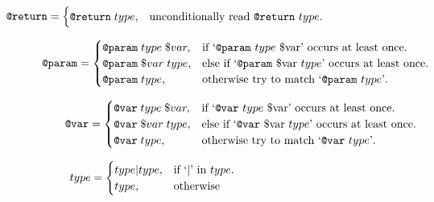 \documentclass[../main.tex]{subfiles}
\begin{document}
\begin{equation}
  \begin{aligned}
  \texttt{@return}=\begin{cases}
    \texttt{@return} \; type, & \text{unconditionally read \texttt{@return} $type$}.\\
  \end{cases}
  \end{aligned}
  \phantom{\hspace{8cm}} %
\end{equation}

\begin{equation}
  \begin{aligned}
  \texttt{@param}=\begin{cases}
    \texttt{@param} \; type \; \$var, & \text{if `\texttt{@param} $type$ \$var' occurs at least once}.\\
    \texttt{@param} \; \$var \; type, & \text{else if `\texttt{@param} \$var $type$' occurs at least once}.\\
    \texttt{@param} \; type, & \text{otherwise try to match `\texttt{@param} $type$'}.\\
  \end{cases}
  \end{aligned}
  \phantom{\hspace{3.55cm}} %
\end{equation}

\begin{equation}
  \begin{aligned}
  \texttt{@var}=\begin{cases}
    \texttt{@var} \; type \; \$var, & \text{if `\texttt{@var} $type$ \$var' occurs at least once}.\\
    \texttt{@var} \; \$var \; type, & \text{else if `\texttt{@var} \$var $type$' occurs at least once}.\\
    \texttt{@var} \; type, & \text{otherwise try to match `\texttt{@var} $type$'}.\\
  \end{cases}
  \end{aligned}
  \phantom{\hspace{3.2cm}} %
\end{equation}

\begin{equation}
  \begin{aligned}
  type=\begin{cases}
    type|type, & \text{if `$\vert$' in $type$}.\\
    type, & \text{otherwise}
  \end{cases}
  \end{aligned}
  \phantom{\hspace{8.8cm}} %
\end{equation}
 
\end{document}
